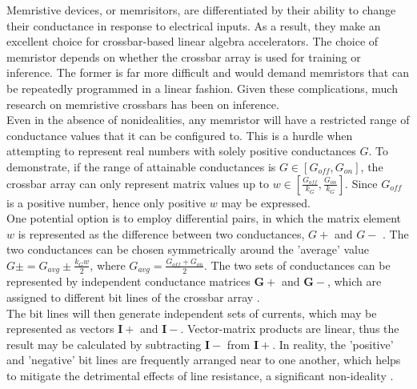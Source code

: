 \noindent Memristive devices, or memrisitors, are differentiated by their ability to change their conductance in response to electrical inputs. As a result, they make an excellent choice for crossbar-based linear algebra accelerators. The choice of memristor depends on whether the crossbar array is used for training or inference. The former is far more difficult and would demand memristors that can be repeatedly programmed in a linear fashion. Given these complications, much research on memristive crossbars has been on inference. \\
    
\noindent Even in the absence of nonidealities, any memristor will have a restricted range of conductance values that it can be configured to. This is a hurdle when attempting to represent real numbers with solely positive conductances $G$. To demonstrate, if the range of attainable conductances is $G \in [G_{off}, G_{on}]$, the crossbar array can only represent matrix values up to $w \in \left [ \frac{G_{off}}{k_G}, \frac{G_{on}}{k_G} \right ]$. Since $G_{off}$ is a positive number, hence only positive $w$ may be expressed. \\
    
\noindent One potential option is to employ differential pairs, in which the matrix element $w$ is represented as the difference between two conductances, $G+$ and $G-$ \cite{joksas2022nonideality}. The two conductances can be chosen symmetrically around the 'average' value $G \pm = G_{avg} \pm \frac{k_G w}{2}$, where $G_{avg} = \frac{G_{off} + G_{on}}{2}$. The two sets of conductances can be represented by independent conductance matrices $\mathbf{G}+$ and $\mathbf{G}-$, which are assigned to different bit lines of the crossbar array \cite{kim20214k}. \\
    
\noindent The bit lines will then generate independent sets of currents, which may be represented as vectors $\mathbf{I}+$ and $\mathbf{I}-$. Vector-matrix products are linear, thus the result may be calculated by subtracting $\mathbf{I}-$ from $\mathbf{I}+$. In reality, the 'positive' and 'negative' bit lines are frequently arranged near to one another, which helps to mitigate the detrimental effects of line resistance, a significant non-ideality \cite{joksas2020committee}. \\



